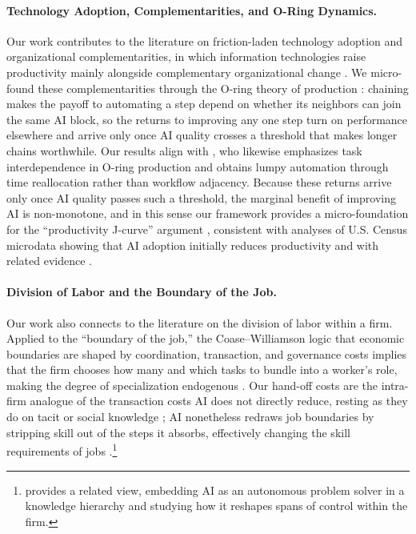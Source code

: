 \paragraph{Technology Adoption, Complementarities, and O-Ring Dynamics.}
Our work contributes to the literature on friction-laden technology adoption and organizational complementarities, in which information technologies raise productivity mainly alongside complementary organizational change \citep{bresnahan2002information, bloom2016management}.
We micro-found these complementarities through the O-ring theory of production \citep{kremer1993oring}: chaining makes the payoff to automating a step depend on whether its neighbors can join the same AI block, so the returns to improving any one step turn on performance elsewhere and arrive only once AI quality crosses a threshold that makes longer chains worthwhile.
Our results align with \citet{gans2026oring}, who likewise emphasizes task interdependence in O-ring production and obtains lumpy automation through time reallocation rather than workflow adjacency.
Because these returns arrive only once AI quality passes such a threshold, the marginal benefit of improving AI is non-monotone, and in this sense our framework provides a micro-foundation for the ``productivity J-curve'' argument \citep{brynjolfsson2021productivity}, consistent with analyses of U.S. Census microdata showing that AI adoption initially reduces productivity \citep{mcelheran2025rise} and with related evidence \citep{furman2019ai, tambe2012productivity, bonney2024tracking, mcelheran2024adoption}.


\paragraph{Division of Labor and the Boundary of the Job.}
Our work also connects to the literature on the division of labor within a firm.
Applied to the ``boundary of the job,'' the Coase--Williamson logic that economic boundaries are shaped by coordination, transaction, and governance costs \citep{coase1937nature, williamson1971vertical, williamson1979transaction} implies that the firm chooses how many and which tasks to bundle into a worker's role, making the degree of specialization endogenous \citep{murphy1986specialization, becker1992division, dessein2006adaptive}.
Our hand-off costs are the intra-firm analogue of the transaction costs AI does not directly reduce, resting as they do on tacit or social knowledge \citep{deming2017growing}; AI nonetheless redraws job boundaries by stripping skill out of the steps it absorbs, effectively changing the skill requirements of jobs \citep{autor2024new, autor2025expertise, autor2026makes}.\footnote{
\cite{ide2025ai} provides a related view, embedding AI as an autonomous problem solver in a knowledge hierarchy \citep{garicano2000hierarchies, garicano2006organization} and studying how it reshapes spans of control within the firm.
}
